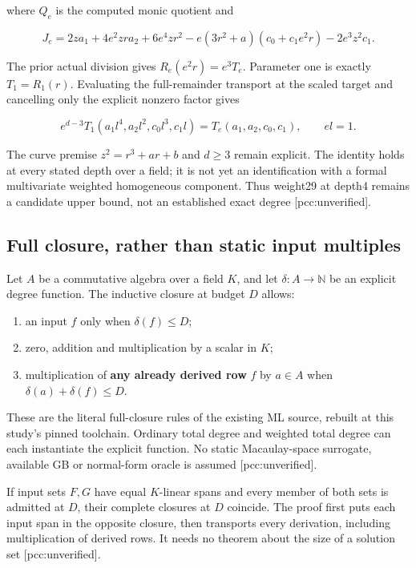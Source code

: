 \documentclass[
  10pt,
]{article}
\providecommand{\tightlist}{%
  \setlength{\itemsep}{0pt}\setlength{\parskip}{0pt}}
\begin{document}
where \(Q_e\) is the computed monic quotient and

\[
J_e=2za_1+4e^2zra_2+6e^4zr^2
 -e(3r^2+a)(c_0+c_1e^2r)-2e^3z^2c_1.
\]

The prior actual division gives \(R_e(e^2r)=e^3T_e\). Parameter one is
exactly \(T_1=R_1(r)\). Evaluating the full-remainder transport at the
scaled target and cancelling only the explicit nonzero factor gives

\[
e^{d-3}T_1(a_1l^4,a_2l^2,c_0l^3,c_1l)
 =T_e(a_1,a_2,c_0,c_1),\qquad el=1.
\]

The curve premise \(z^2=r^3+ar+b\) and \(d\ge3\) remain explicit. The
identity holds at every stated depth over a field; it is not yet an
identification with a formal multivariate weighted homogeneous
component. Thus weight29 at depth4 remains a candidate upper bound, not
an established exact degree {[}pcc:unverified{]}.

\subsection{Full closure, rather than static input
multiples}\label{full-closure-rather-than-static-input-multiples}

Let \(A\) be a commutative algebra over a field \(K\), and let
\(\delta:A\to\mathbb N\) be an explicit degree function. The inductive
closure at budget \(D\) allows:

\begin{enumerate}
\def\labelenumi{\arabic{enumi}.}
\tightlist
\item
  an input \(f\) only when \(\delta(f)\le D\);
\item
  zero, addition and multiplication by a scalar in \(K\);
\item
  multiplication of \textbf{any already derived row} \(f\) by \(a\in A\)
  when \(\delta(a)+\delta(f)\le D\).
\end{enumerate}

These are the literal full-closure rules of the existing ML source,
rebuilt at this study's pinned toolchain. Ordinary total degree and
weighted total degree can each instantiate the explicit function. No
static Macaulay-space surrogate, available GB or normal-form oracle is
assumed {[}pcc:unverified{]}.

If input sets \(F,G\) have equal \(K\)-linear spans and every member of
both sets is admitted at \(D\), their complete closures at \(D\)
coincide. The proof first puts each input span in the opposite closure,
then transports every derivation, including multiplication of derived
rows. It needs no theorem about the size of a solution set
{[}pcc:unverified{]}.
\end{document}
